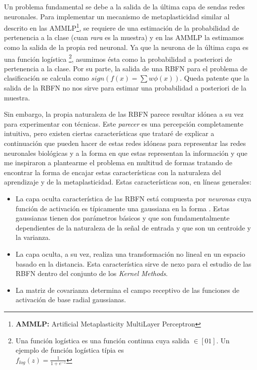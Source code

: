 \documentclass[10pt,a4paper]{report}
\begin{document}
Un problema fundamental se debe a la salida de la última capa de sendas redes neuronales. Para implementar un mecanismo de metaplasticidad similar al descrito en las AMMLP\footnote{\textbf{AMMLP:} Artificial Metaplasticity MultiLayer Perceptron}\cite{Andina2009}, se requiere de una estimación de la probabilidad de pertenencia a la clase (cuan \textit{rara} es la muestra) y en las AMMLP la estimamos como la salida de la propia red neuronal. Ya que la neurona de la última capa es una función logística \footnote{Una función logística es una función continua cuya salida $\in [0 1]$. Un ejemplo de función logística típia es \\ $f_{log}(z)=\frac{1}{1+e^{-z}}$}, asumimos ésta como la probabilidad a posteriori de pertenencia a la clase. Por su parte, la salida de una RBFN para el problema de clasificación se calcula como $sign(f(x)=\sum w \phi(x))$. Queda patente que la salida de la RBFN no nos sirve para estimar una probabilidad a posteriori de la muestra.

Sin embargo, la propia naturaleza de las RBFN parece resultar idónea a su vez para experimentar con técnicas. Este \textit{parecer} es una percepción completamente intuitiva, pero existen ciertas características que trataré de explicar a continuación que pueden hacer de estas redes idóneas para representar las redes neuronales biológicas y a la forma en que estas representan la información y que me inspiraron a plantearme el problema en multitud de formas tratando de encontrar la forma de encajar estas características con la naturaleza del aprendizaje y de la metaplasticidad. Estas características son, en líneas generales:

\begin{itemize}
	\item La capa oculta característica de las RBFN está compuesta por \textit{neuronas} cuya función de activación es típicamente una gaussiana en la forma . Estas gaussianas tienen dos parámetros básicos y que son fundamentalmente dependientes de la naturaleza de la señal de entrada y que son un centroide y la varianza.
	\item La capa oculta, a su vez, realiza una transformación no lineal en un espacio basado en la distancia. Esta característica sirve de nexo para el estudio de las RBFN dentro del conjunto de los \textit{Kernel Methods}.
	\item La matriz de covarianza determina el campo receptivo de las funciones de activación de base radial gaussianas.
\end{itemize}
\end{document}
